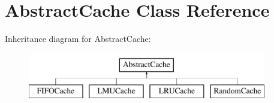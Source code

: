 \hypertarget{classAbstractCache}{\section{\-Abstract\-Cache \-Class \-Reference}
\label{classAbstractCache}
}
\-Inheritance diagram for \-Abstract\-Cache\-:\begin{figure}[H]
\begin{center}
\leavevmode
\includegraphics[height=2.000000cm]{classAbstractCache}
\end{center}
\end{figure}
